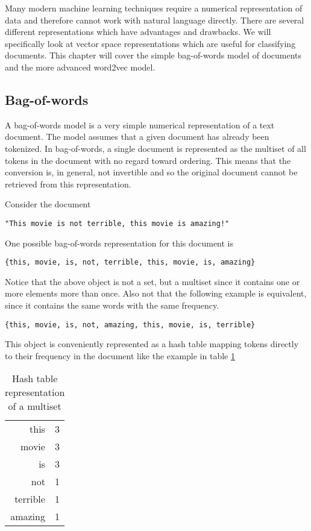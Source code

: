 Many modern machine learning techniques require a numerical representation of data and therefore cannot work with natural language directly.  There are several different representations which have advantages and drawbacks.  We will specifically look at vector space representations which are useful for classifying documents.  This chapter will cover the simple bag-of-words model of documents and the more advanced word2vec model.

\subsection{Bag-of-words} \label{sec:bow}
A bag-of-words model is a very simple numerical representation of a text document.  The model assumes that a given document has already been tokenized.  In bag-of-words, a single document is represented as the multiset of all tokens in the document with no regard toward ordering.  This means that the conversion is, in general, not invertible and so the original document cannot be retrieved from this representation.

Consider the document
\begin{center}
\texttt{"This movie is not terrible, this movie is amazing!"}
\end{center}
One possible bag-of-words representation for this document is
\begin{center}
\texttt{\{this, movie, is, not, terrible, this, movie, is, amazing\}}
\end{center}
Notice that the above object is not a set, but a multiset since it contains one or more elements more than once.  Also not that the following example is equivalent, since it contains the same words with the same frequency.
\begin{center}
\texttt{\{this, movie, is, not, amazing, this, movie, is, terrible\}}
\end{center}

This object is conveniently represented as a hash table mapping tokens directly to their frequency in the document like the example in table \ref{tab:hash}
\begin{table}[h]
\centering
\begin{tabular}{ r l }
 this & 3 \\ 
 movie & 3 \\  
 is & 3 \\ 
 not & 1 \\
 terrible & 1 \\
 amazing & 1 \\
\end{tabular}
\caption{Hash table representation of a multiset}
\label{tab:hash}
\end{table}

